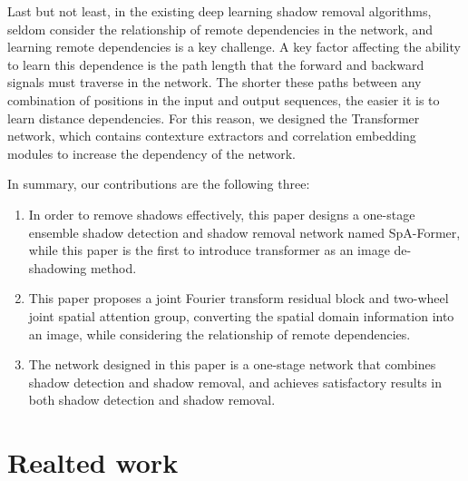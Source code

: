 \documentclass[journal]{IEEEtran}
\begin{document}
\par
Last but not least, in the existing deep learning shadow removal algorithms, seldom consider the relationship of remote dependencies in the network, and learning remote dependencies is a key challenge. A key factor affecting the ability to learn this dependence is the path length that the forward and backward signals must traverse in the network. The shorter these paths between any combination of positions in the input and output sequences, the easier it is to learn distance dependencies. For this reason, we designed the Transformer network, which contains contexture extractors and correlation embedding modules to increase the dependency of the network.

In summary, our contributions are the following three:
\begin{enumerate}
 \item In order to remove shadows effectively, this paper designs a one-stage ensemble shadow detection and shadow removal network named SpA-Former, while this paper is the first to introduce transformer as an image de-shadowing method.
 \item This paper proposes a joint Fourier transform residual block and two-wheel joint spatial attention group, converting the spatial domain information into an image, while considering the relationship of remote dependencies.
\item The network designed in this paper is a one-stage network that combines shadow detection and shadow removal, and achieves satisfactory results in both shadow detection and shadow removal.
\end{enumerate}
\section{Realted work}
\end{document}

